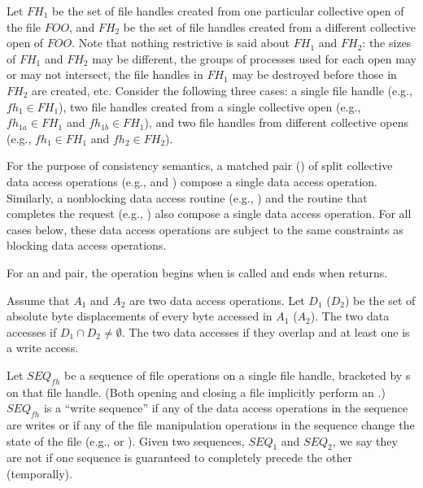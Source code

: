 Let $FH_1$ be the set of file handles created
from one particular collective open of the file $FOO$,
and $FH_2$ be the set of file handles created
from a different collective open of $FOO$.
Note that nothing restrictive is said about $FH_1$ and $FH_2$:
the sizes of $FH_1$ and $FH_2$ may be different,
the groups of processes used for each open may or may not intersect,
the file handles in $FH_1$ may be destroyed
before those in $FH_2$ are created, etc.
Consider the following three cases:
a single file handle (e.g., $fh_1 \in FH_1$),
two file handles created from a single collective open
  (e.g., $fh_{1a} \in FH_1$ and $fh_{1b} \in FH_1$), and
two file handles from different collective opens
  (e.g., $fh_1 \in FH_1$ and $fh_2 \in FH_2$).

For the purpose of consistency semantics, a matched 
pair () of split
collective data access operations (e.g.,  and
) compose a single data access
operation.
Similarly, a nonblocking data access routine
(e.g., ) and the
routine that completes the request
(e.g., ) also compose a single data
access operation.
For all cases below, these data access operations 
are subject to the same constraints as blocking data access operations.

\begin{users}
For an  and  pair,
the operation begins when  is called and
ends when  returns.
\end{users}

Assume that $A_1$ and $A_2$ are two data access operations.
Let $D_1$ ($D_2$) be the set of absolute byte displacements
of every byte accessed in $A_1$ ($A_2$).
The two data accesses 
if $ D_1 \cap D_2 \not= \emptyset $.
The two data accesses 
if they overlap and at least one is a write access.

Let $SEQ_{fh}$ be a sequence of file operations on a single file handle,
bracketed by s on that file handle.
(Both opening and closing a file implicitly perform an .)
$SEQ_{fh}$ is a ``write sequence''
if any of the data access operations in the sequence are writes
or if any of the file manipulation operations in the sequence
change the state of the file
(e.g.,  or ).
Given two sequences, $SEQ_1$ and $SEQ_2$,
we say they
are not 
if one sequence is guaranteed to completely precede the other (temporally).

